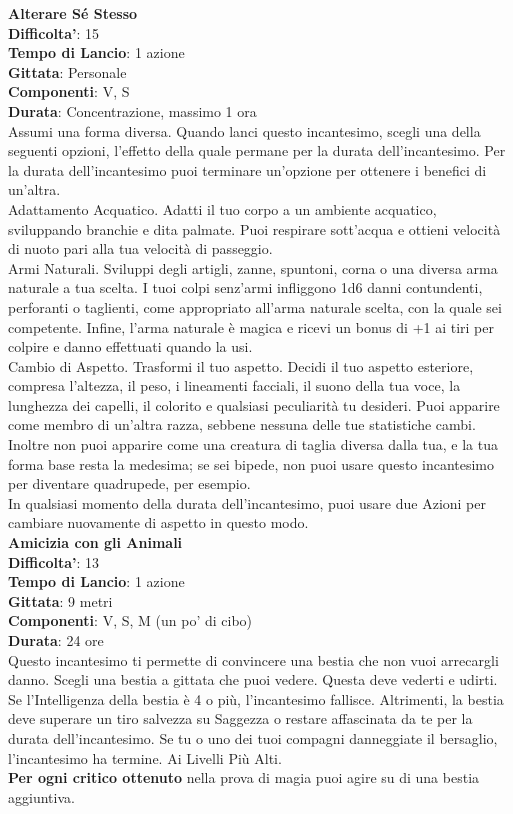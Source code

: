 \begin{multicols}{2}
\medskip\textbf{Alterare Sé Stesso}\\
\textbf{Difficolta'}: 15\\
\textbf{Tempo di Lancio}: 1 azione\\
\textbf{Gittata}: Personale\\
\textbf{Componenti}: V, S\\
\textbf{Durata}: Concentrazione, massimo 1 ora\\
Assumi una forma diversa. Quando lanci questo incantesimo, scegli una della seguenti opzioni, l’effetto della quale permane per la durata dell’incantesimo. Per  la durata dell’incantesimo puoi terminare un’opzione per ottenere i benefici di un’altra.\\
Adattamento Acquatico. Adatti il tuo corpo a un ambiente acquatico, sviluppando branchie e dita palmate. Puoi respirare sott’acqua e ottieni velocità di nuoto pari alla tua velocità di passeggio.\\
Armi Naturali. Sviluppi degli artigli, zanne, spuntoni, corna o una diversa arma naturale a tua scelta. I tuoi colpi senz’armi infliggono 1d6 danni contundenti, perforanti o taglienti, come appropriato all’arma naturale scelta, con la quale sei competente. Infine, l’arma naturale è magica e ricevi un bonus di +1 ai tiri per colpire e danno effettuati quando la usi.\\
Cambio di Aspetto. Trasformi il tuo aspetto. Decidi il tuo aspetto esteriore, compresa l’altezza, il peso, i lineamenti facciali, il suono della tua voce, la lunghezza dei capelli, il colorito e qualsiasi peculiarità tu desideri. Puoi apparire come membro di un’altra razza, sebbene nessuna delle tue statistiche cambi. Inoltre non puoi apparire come una creatura di taglia diversa dalla tua, e la tua forma base resta la medesima; se sei bipede, non puoi usare questo incantesimo per diventare quadrupede, per esempio.\\
In qualsiasi momento della durata dell’incantesimo, puoi usare due Azioni per cambiare nuovamente di aspetto in questo modo.\\

\medskip\textbf{Amicizia con gli Animali}\\
\textbf{Difficolta'}: 13\\
\textbf{Tempo di Lancio}: 1 azione\\
\textbf{Gittata}: 9 metri\\
\textbf{Componenti}: V, S, M (un po’ di cibo)\\
\textbf{Durata}: 24 ore\\
Questo incantesimo ti permette di convincere una bestia che non vuoi arrecargli danno. Scegli una bestia a gittata che puoi vedere. Questa deve vederti e udirti. Se l’Intelligenza della bestia è 4 o più, l’incantesimo fallisce. Altrimenti, la bestia deve superare un tiro salvezza su Saggezza o restare affascinata da te per la durata dell’incantesimo. Se tu o uno dei tuoi compagni danneggiate il bersaglio, l’incantesimo ha termine. Ai Livelli Più Alti.\\
\textbf{Per ogni critico ottenuto} nella prova di magia puoi agire su di una bestia aggiuntiva. 


\end{multicols}
